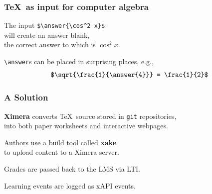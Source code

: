 \documentclass[aspectratio=169,14pt]{beamer}
\begin{document}
\begin{frame}
  \frametitle{\TeX\ as input for computer algebra}
  \large

  The input \texttt{\$\textbackslash answer\{\textbackslash cos\^{}2 x\}\$} \\
  \quad will create an answer blank, \\
  \quad\quad the correct answer to which is $\cos^2 x$.

  \vfill
  
  \texttt{\textbackslash answer}s can be placed in surprising places, e.g.,
  \[
    \mbox{\texttt{\$\textbackslash sqrt\{\textbackslash frac\{1\}\{\textbackslash answer\{4\}\}\} = \textbackslash frac\{1\}\{2\}\$}}
  \]

  \vfill
  
\end{frame}

\begin{frame}
  \frametitle{A Solution}
  \large

  \textbf{Ximera} converts \TeX\ source stored in \texttt{git} repositories, \\
  \quad into both paper worksheets and interactive webpages. \\

  \vfill

  Authors use a build tool called \textbf{xake} \\
  \quad to upload content to a Ximera server.

  \vfill

  Grades are passed back to the LMS via LTI.

  \vfill

  Learning events are logged as xAPI events.
  

  \vfill
  
\end{frame}
\end{document}
